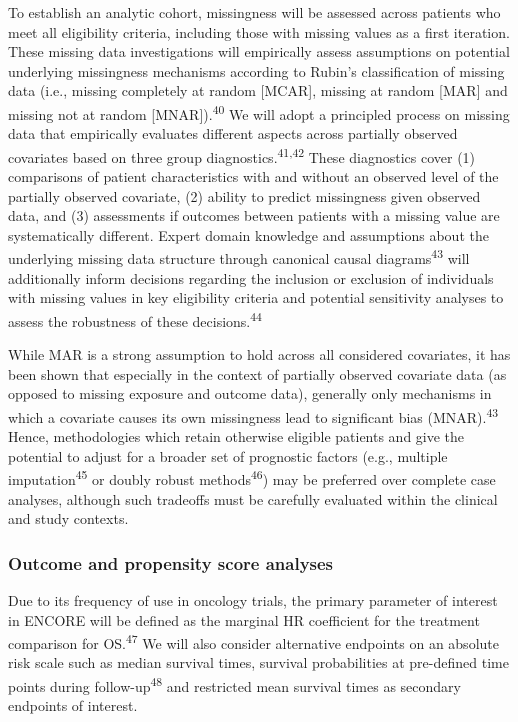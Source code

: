 \documentclass[
  letterpaper,
  DIV=11,
  numbers=noendperiod]{scrartcl}
\begin{document}
To establish an analytic cohort, missingness will be assessed across
patients who meet all eligibility criteria, including those with missing
values as a first iteration. These missing data investigations will
empirically assess assumptions on potential underlying missingness
mechanisms according to Rubin's classification of missing data (i.e.,
missing completely at random {[}MCAR{]}, missing at random {[}MAR{]} and
missing not at random {[}MNAR{]}).\textsuperscript{40} We will adopt a
principled process on missing data that empirically evaluates different
aspects across partially observed covariates based on three group
diagnostics.\textsuperscript{41,42} These diagnostics cover (1)
comparisons of patient characteristics with and without an observed
level of the partially observed covariate, (2) ability to predict
missingness given observed data, and (3) assessments if outcomes between
patients with a missing value are systematically different. Expert
domain knowledge and assumptions about the underlying missing data
structure through canonical causal diagrams\textsuperscript{43} will
additionally inform decisions regarding the inclusion or exclusion of
individuals with missing values in key eligibility criteria and
potential sensitivity analyses to assess the robustness of these
decisions.\textsuperscript{44}

While MAR is a strong assumption to hold across all considered
covariates, it has been shown that especially in the context of
partially observed covariate data (as opposed to missing exposure and
outcome data), generally only mechanisms in which a covariate causes its
own missingness lead to significant bias (MNAR).\textsuperscript{43}
Hence, methodologies which retain otherwise eligible patients and give
the potential to adjust for a broader set of prognostic factors (e.g.,
multiple imputation\textsuperscript{45} or doubly robust
methods\textsuperscript{46}) may be preferred over complete case
analyses, although such tradeoffs must be carefully evaluated within the
clinical and study contexts.

\subsubsection{Outcome and propensity score
analyses}\label{outcome-and-propensity-score-analyses}

Due to its frequency of use in oncology trials, the primary parameter of
interest in ENCORE will be defined as the marginal HR coefficient for
the treatment comparison for OS.\textsuperscript{47} We will also
consider alternative endpoints on an absolute risk scale such as median
survival times, survival probabilities at pre-defined time points during
follow-up\textsuperscript{48} and restricted mean survival times as
secondary endpoints of interest.
\end{document}
